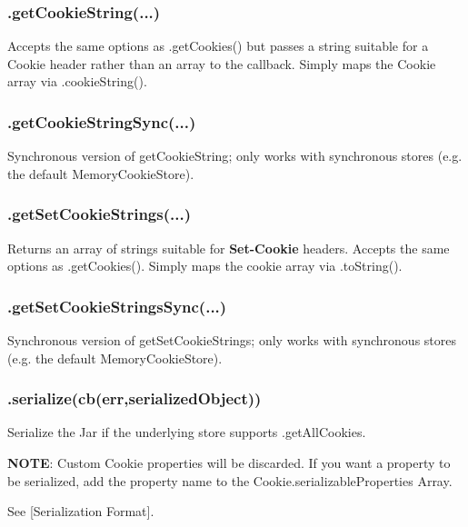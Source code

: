 \subsubsection*{{\ttfamily .get\+Cookie\+String(...)}}

Accepts the same options as {\ttfamily .get\+Cookies()} but passes a string suitable for a Cookie header rather than an array to the callback. Simply maps the {\ttfamily Cookie} array via {\ttfamily .cookie\+String()}.

\subsubsection*{{\ttfamily .get\+Cookie\+String\+Sync(...)}}

Synchronous version of {\ttfamily get\+Cookie\+String}; only works with synchronous stores (e.\+g. the default {\ttfamily Memory\+Cookie\+Store}).

\subsubsection*{{\ttfamily .get\+Set\+Cookie\+Strings(...)}}

Returns an array of strings suitable for {\bfseries Set-\/\+Cookie} headers. Accepts the same options as {\ttfamily .get\+Cookies()}. Simply maps the cookie array via {\ttfamily .to\+String()}.

\subsubsection*{{\ttfamily .get\+Set\+Cookie\+Strings\+Sync(...)}}

Synchronous version of {\ttfamily get\+Set\+Cookie\+Strings}; only works with synchronous stores (e.\+g. the default {\ttfamily Memory\+Cookie\+Store}).

\subsubsection*{{\ttfamily .serialize(cb(err,serialized\+Object))}}

Serialize the Jar if the underlying store supports {\ttfamily .get\+All\+Cookies}.

{\bfseries N\+O\+TE}\+: Custom {\ttfamily Cookie} properties will be discarded. If you want a property to be serialized, add the property name to the {\ttfamily Cookie.\+serializable\+Properties} Array.

See \mbox{[}Serialization Format\mbox{]}.

